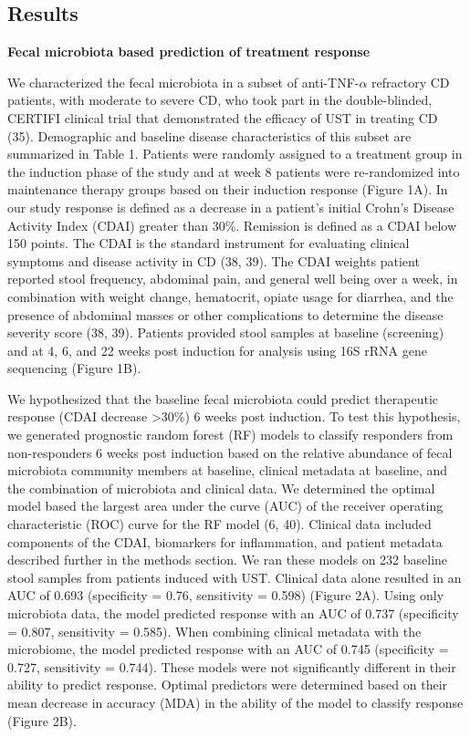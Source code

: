\documentclass[12pt,]{article}
\begin{document}
\subsection{Results}\label{results}

\textbf{Fecal microbiota based prediction of treatment response}

We characterized the fecal microbiota in a subset of
anti-TNF-\({\alpha}\) refractory CD patients, with moderate to severe
CD, who took part in the double-blinded, CERTIFI clinical trial that
demonstrated the efficacy of UST in treating CD (35). Demographic and
baseline disease characteristics of this subset are summarized in Table
1. Patients were randomly assigned to a treatment group in the induction
phase of the study and at week 8 patients were re-randomized into
maintenance therapy groups based on their induction response (Figure
1A). In our study response is defined as a decrease in a patient's
initial Crohn's Disease Activity Index (CDAI) greater than 30\%.
Remission is defined as a CDAI below 150 points. The CDAI is the
standard instrument for evaluating clinical symptoms and disease
activity in CD (38, 39). The CDAI weights patient reported stool
frequency, abdominal pain, and general well being over a week, in
combination with weight change, hematocrit, opiate usage for diarrhea,
and the presence of abdominal masses or other complications to determine
the disease severity score (38, 39). Patients provided stool samples at
baseline (screening) and at 4, 6, and 22 weeks post induction for
analysis using 16S rRNA gene sequencing (Figure 1B).

We hypothesized that the baseline fecal microbiota could predict
therapeutic response (CDAI decrease \textgreater{}30\%) 6 weeks post
induction. To test this hypothesis, we generated prognostic random
forest (RF) models to classify responders from non-responders 6 weeks
post induction based on the relative abundance of fecal microbiota
community members at baseline, clinical metadata at baseline, and the
combination of microbiota and clinical data. We determined the optimal
model based the largest area under the curve (AUC) of the receiver
operating characteristic (ROC) curve for the RF model (6, 40). Clinical
data included components of the CDAI, biomarkers for inflammation, and
patient metadata described further in the methods section. We ran these
models on 232 baseline stool samples from patients induced with UST.
Clinical data alone resulted in an AUC of 0.693 (specificity = 0.76,
sensitivity = 0.598) (Figure 2A). Using only microbiota data, the model
predicted response with an AUC of 0.737 (specificity = 0.807,
sensitivity = 0.585). When combining clinical metadata with the
microbiome, the model predicted response with an AUC of 0.745
(specificity = 0.727, sensitivity = 0.744). These models were not
significantly different in their ability to predict response. Optimal
predictors were determined based on their mean decrease in accuracy
(MDA) in the ability of the model to classify response (Figure 2B).
\end{document}
